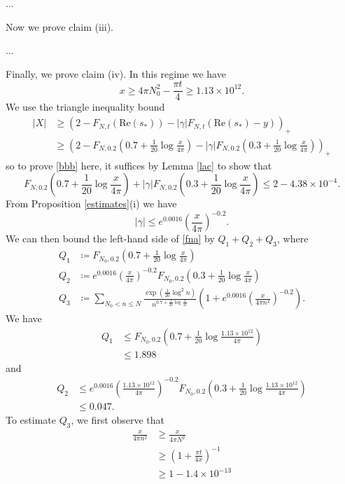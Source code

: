 ...

Now we prove claim (iii).

...

Finally, we prove claim (iv).  In this regime we have
$$ x \geq 4\pi N_0^2 - \frac{\pi t}{4} \geq 1.13 \times 10^{12}.$$
We use the triangle inequality bound
\begin{align*}
|X| &\geq \left( 2 - F_{N,t}(\mathrm{Re}(s_*)) - |\gamma| F_{N,t}(\mathrm{Re}(s_*) - y) \right)_+ \\
&\geq \left( 2 - F_{N,0.2}(0.7 + \frac{1}{20} \log \frac{x}{4\pi}) - |\gamma| F_{N,0.2}(0.3 + \frac{1}{20} \log \frac{x}{4\pi}) \right)_+ 
\end{align*}
so to prove \eqref{bbb} here, it suffices by Lemma \ref{lac} to show that
\begin{equation}\label{fna}
F_{N,0.2}(0.7 + \frac{1}{20} \log \frac{x}{4\pi}) + |\gamma| F_{N,0.2}( 0.3 + \frac{1}{20} \log \frac{x}{4\pi} )  \leq 2 - 4.38 \times 10^{-4}.
\end{equation}
From Proposition \ref{estimates}(i) we have
$$ |\gamma| \leq e^{0.0016} \left( \frac{x}{4\pi} \right)^{-0.2}.$$
We can then bound the left-hand side of \eqref{fna} by $Q_1+Q_2+Q_3$, where
\begin{align*}
Q_1 &\coloneqq F_{N_0,0.2}(0.7 + \frac{1}{20} \log \frac{x}{4\pi}) \\
Q_2 &\coloneqq e^{0.0016} \left( \frac{x}{4\pi} \right)^{-0.2} F_{N_0,0.2}( 0.3 + \frac{1}{20} \log \frac{x}{4\pi} ) \\
Q_3 &\coloneqq \sum_{N_0 < n \leq N} \frac{\exp( \frac{1}{20} \log^2 n)}{n^{0.7 + \frac{1}{20} \log \frac{x}{4\pi}}} (1 + e^{0.0016} (\frac{x}{4\pi n^2})^{-0.2}).
\end{align*}
We have
\begin{align*}
Q_1 &\leq F_{N_0,0.2}(0.7 + \frac{1}{20} \log \frac{1.13 \times 10^{12}}{4\pi}) \\
&\leq 1.898
\end{align*}
and
\begin{align*}
Q_2 &\leq e^{0.0016} \left( \frac{1.13 \times 10^{12}}{4\pi} \right)^{-0.2}  F_{N_0,0.2}(0.3 + \frac{1}{20} \log \frac{1.13 \times 10^{12}}{4\pi}) \\
&\leq 0.047.
\end{align*}
To estimate $Q_3$, we first observe that
\begin{align*}
\frac{x}{4\pi n^2} &\geq \frac{x}{4\pi N^2} \\
&\geq \left(1 + \frac{\pi t}{4x}\right)^{-1} \\
&\geq 1 - 1.4 \times 10^{-13}
\end{align*}
